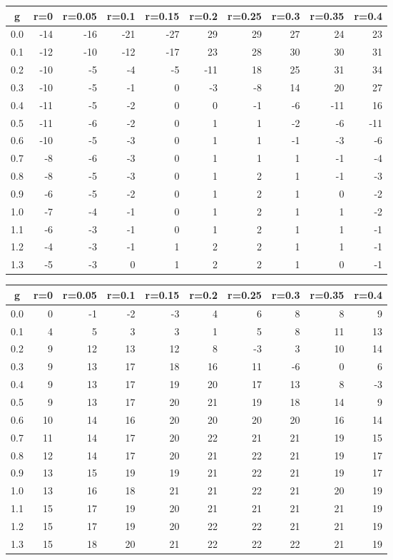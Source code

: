 %
\begin{table}[!tbp]
 \begin{center}
 \begin{tabular}{rrrrrrrrrr}\hline\hline
\multicolumn{1}{c}{g}&\multicolumn{1}{c}{r=0}&\multicolumn{1}{c}{r=0.05}&\multicolumn{1}{c}{r=0.1}&\multicolumn{1}{c}{r=0.15}&\multicolumn{1}{c}{r=0.2}&\multicolumn{1}{c}{r=0.25}&\multicolumn{1}{c}{r=0.3}&\multicolumn{1}{c}{r=0.35}&\multicolumn{1}{c}{r=0.4}\tabularnewline
\hline
0.0&-14&-16&-21&-27& 29&29&27& 24& 23\tabularnewline
0.1&-12&-10&-12&-17& 23&28&30& 30& 31\tabularnewline
0.2&-10& -5& -4& -5&-11&18&25& 31& 34\tabularnewline
0.3&-10& -5& -1&  0& -3&-8&14& 20& 27\tabularnewline
0.4&-11& -5& -2&  0&  0&-1&-6&-11& 16\tabularnewline
0.5&-11& -6& -2&  0&  1& 1&-2& -6&-11\tabularnewline
0.6&-10& -5& -3&  0&  1& 1&-1& -3& -6\tabularnewline
0.7& -8& -6& -3&  0&  1& 1& 1& -1& -4\tabularnewline
0.8& -8& -5& -3&  0&  1& 2& 1& -1& -3\tabularnewline
0.9& -6& -5& -2&  0&  1& 2& 1&  0& -2\tabularnewline
1.0& -7& -4& -1&  0&  1& 2& 1&  1& -2\tabularnewline
1.1& -6& -3& -1&  0&  1& 2& 1&  1& -1\tabularnewline
1.2& -4& -3& -1&  1&  2& 2& 1&  1& -1\tabularnewline
1.3& -5& -3&  0&  1&  2& 2& 1&  0& -1\tabularnewline
\hline
\end{tabular}

\end{center}

\end{table}

%
\begin{table}[!tbp]
 \begin{center}
 \begin{tabular}{rrrrrrrrrr}\hline\hline
\multicolumn{1}{c}{g}&\multicolumn{1}{c}{r=0}&\multicolumn{1}{c}{r=0.05}&\multicolumn{1}{c}{r=0.1}&\multicolumn{1}{c}{r=0.15}&\multicolumn{1}{c}{r=0.2}&\multicolumn{1}{c}{r=0.25}&\multicolumn{1}{c}{r=0.3}&\multicolumn{1}{c}{r=0.35}&\multicolumn{1}{c}{r=0.4}\tabularnewline
\hline
0.0& 0&-1&-2&-3& 4& 6& 8& 8& 9\tabularnewline
0.1& 4& 5& 3& 3& 1& 5& 8&11&13\tabularnewline
0.2& 9&12&13&12& 8&-3& 3&10&14\tabularnewline
0.3& 9&13&17&18&16&11&-6& 0& 6\tabularnewline
0.4& 9&13&17&19&20&17&13& 8&-3\tabularnewline
0.5& 9&13&17&20&21&19&18&14& 9\tabularnewline
0.6&10&14&16&20&20&20&20&16&14\tabularnewline
0.7&11&14&17&20&22&21&21&19&15\tabularnewline
0.8&12&14&17&20&21&22&21&19&17\tabularnewline
0.9&13&15&19&19&21&22&21&19&17\tabularnewline
1.0&13&16&18&21&21&22&21&20&19\tabularnewline
1.1&15&17&19&20&21&21&21&21&19\tabularnewline
1.2&15&17&19&20&22&22&21&21&19\tabularnewline
1.3&15&18&20&21&22&22&22&21&19\tabularnewline
\hline
\end{tabular}

\end{center}

\end{table}

